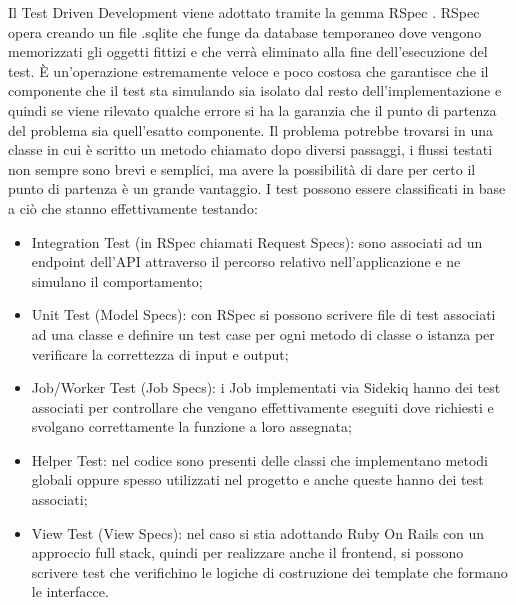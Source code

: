 \documentclass[target=bach,aauheader=,style=]{thud}
\begin{document}
Il Test Driven Development viene adottato tramite la gemma RSpec \cite{rspec_home}.
RSpec opera creando un file .sqlite che funge da database temporaneo dove vengono memorizzati gli oggetti fittizi e che verrà eliminato alla fine dell'esecuzione del test.
È un'operazione estremamente veloce e poco costosa che garantisce che il componente che il test sta simulando sia isolato dal resto dell'implementazione e quindi se viene rilevato qualche errore
si ha la garanzia che il punto di partenza del problema sia quell'esatto componente. Il problema potrebbe trovarsi in una classe in cui è scritto un metodo chiamato dopo diversi passaggi,
i flussi testati non sempre sono brevi e semplici, ma avere la possibilità di dare per certo il punto di partenza è un grande vantaggio. I test possono essere classificati in base a ciò che
stanno effettivamente testando:
\begin{itemize}
    \item Integration Test (in RSpec chiamati Request Specs): sono associati ad un endpoint dell'API attraverso il percorso relativo nell'applicazione e ne simulano il comportamento;
    \item Unit Test (Model Specs): con RSpec si possono scrivere file di test associati ad una classe e definire un test case per ogni metodo di classe o istanza per verificare la correttezza di
    input e output;
    \item Job/Worker Test (Job Specs): i Job implementati via Sidekiq hanno dei test associati per controllare che vengano effettivamente eseguiti dove richiesti e svolgano correttamente la funzione
    a loro assegnata;
    \item Helper Test: nel codice sono presenti delle classi che implementano metodi globali oppure spesso utilizzati nel progetto e anche queste hanno dei test associati;
    \item View Test (View Specs): nel caso si stia adottando Ruby On Rails con un approccio full stack, quindi per realizzare anche il frontend, si possono scrivere test che verifichino le logiche di
          costruzione dei template che formano le interfacce.
\end{itemize}
\end{document}
